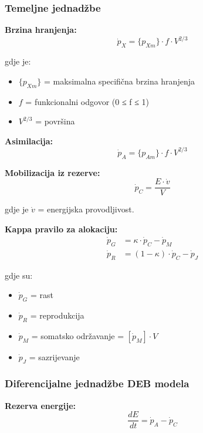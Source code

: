 \documentclass[11pt,oneside]{book}
\begin{document}
\subsubsection{Temeljne jednadžbe}

\textbf{Brzina hranjenja:}
\begin{equation}
	\dot{p}_X = \{p_{Xm}\} \cdot f \cdot V^{2/3}
\end{equation}

gdje je:
\begin{itemize}
	\item $\{p_{Xm}\}$ = maksimalna specifična brzina hranjenja
	\item $f$ = funkcionalni odgovor (0 ≤ f ≤ 1)
	\item $V^{2/3}$ = površina
\end{itemize}

\textbf{Asimilacija:}
\begin{equation}
	\dot{p}_A = \{p_{Am}\} \cdot f \cdot V^{2/3}
\end{equation}

\textbf{Mobilizacija iz rezerve:}
\begin{equation}
	\dot{p}_C = \frac{E \cdot \dot{v}}{V}
\end{equation}

gdje je $\dot{v}$ = energijska provodljivost.

\textbf{Kappa pravilo za alokaciju:}
\begin{align}
	\dot{p}_G &= \kappa \cdot \dot{p}_C - \dot{p}_M\\
	\dot{p}_R &= (1-\kappa) \cdot \dot{p}_C - \dot{p}_J
\end{align}

gdje su:
\begin{itemize}
	\item $\dot{p}_G$ = rast
	\item $\dot{p}_R$ = reprodukcija
	\item $\dot{p}_M$ = somatsko održavanje = $[\dot{p}_M] \cdot V$
	\item $\dot{p}_J$ = sazrijevanje
\end{itemize}

\subsubsection{Diferencijalne jednadžbe DEB modela}

\textbf{Rezerva energije:}
\begin{equation}
	\frac{dE}{dt} = \dot{p}_A - \dot{p}_C
\end{equation}
\end{document}
